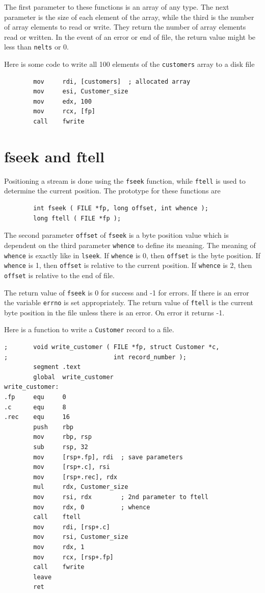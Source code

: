 \documentclass[11pt,b5paper]{book}
\begin{document}
The first parameter to these functions is an array of any type.
The next parameter is the size of each element of the array, while the third is
the number of array elements to read or write.
They return the number of array elements read or written.
In the event of an error or end of file, the return value might be less than {\tt nelts} or 0.

Here is some code to write all 100 elements of the {\tt customers} array to a disk file
\begin{verbatim}
        mov     rdi, [customers]  ; allocated array
        mov     esi, Customer_size
        mov     edx, 100
        mov     rcx, [fp]
        call    fwrite
\end{verbatim}


\section{fseek and ftell}

Positioning a stream is done using the {\tt fseek} function, while {\tt ftell} is used to determine the current position.
The prototype for these functions are
\begin{verbatim}
        int fseek ( FILE *fp, long offset, int whence );
        long ftell ( FILE *fp );
\end{verbatim}
The second parameter {\tt offset} of {\tt fseek} is a byte position value which is dependent on the third
parameter {\tt whence} to define its meaning.
The meaning of {\tt whence} is exactly like in {\tt lseek}.
If {\tt whence} is 0, then {\tt offset} is the byte position.
If {\tt whence} is 1, then {\tt offset} is relative to the current position.
If {\tt whence} is 2, then {\tt offset} is relative to the end of file.

The return value of {\tt fseek} is 0 for success and -1 for errors.
If there is an error the variable {\tt errno} is set appropriately.
The return value of {\tt ftell} is the current byte position in the file unless there is an error.
On error it returns -1.

Here is a function to write a {\tt Customer} record to a file.
\begin{verbatim}
;       void write_customer ( FILE *fp, struct Customer *c,
;                             int record_number );
        segment .text
        global  write_customer
write_customer:
.fp     equ     0
.c      equ     8
.rec    equ     16
        push    rbp
        mov     rbp, rsp
        sub     rsp, 32
        mov     [rsp+.fp], rdi  ; save parameters
        mov     [rsp+.c], rsi
        mov     [rsp+.rec], rdx
        mul     rdx, Customer_size
        mov     rsi, rdx        ; 2nd parameter to ftell
        mov     rdx, 0          ; whence
        call    ftell
        mov     rdi, [rsp+.c]
        mov     rsi, Customer_size
        mov     rdx, 1
        mov     rcx, [rsp+.fp]
        call    fwrite
        leave
        ret
\end{verbatim}
\end{document}
